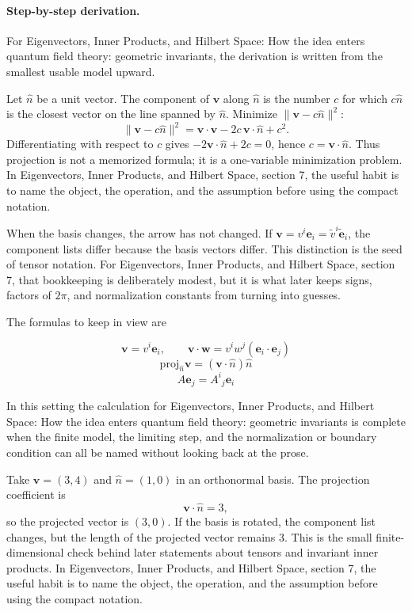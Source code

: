 \paragraph{Step-by-step derivation.}

For Eigenvectors, Inner Products, and Hilbert Space: How the idea enters quantum field theory: geometric invariants, the derivation is written from the smallest usable model upward.

Let \(\hat n\) be a unit vector.  The component of \(\bm v\) along \(\hat n\) is the number \(c\) for which \(c\hat n\) is the closest vector on the line spanned by \(\hat n\).  Minimize \(\|\bm v-c\hat n\|^2\):
\[
  \|\bm v-c\hat n\|^2=\bm v\cdot\bm v-2c\,\bm v\cdot\hat n+c^2.
\]
Differentiating with respect to \(c\) gives \(-2\bm v\cdot\hat n+2c=0\), hence \(c=\bm v\cdot\hat n\).  Thus projection is not a memorized formula; it is a one-variable minimization problem.  In Eigenvectors, Inner Products, and Hilbert Space, section 7, the useful habit is to name the object, the operation, and the assumption before using the compact notation.

When the basis changes, the arrow has not changed.  If \(\bm v=v^i\bm e_i=\tilde v^i\tilde{\bm e}_i\), the component lists differ because the basis vectors differ.  This distinction is the seed of tensor notation.  For Eigenvectors, Inner Products, and Hilbert Space, section 7, that bookkeeping is deliberately modest, but it is what later keeps signs, factors of \(2\pi\), and normalization constants from turning into guesses.

The formulas to keep in view are

\[
  \bm v=v^i\bm e_i,\qquad \bm v\cdot\bm w=v^iw^j(\bm e_i\cdot\bm e_j)
\]
\[
  \mathrm{proj}_{\hat n}\bm v=(\bm v\cdot\hat n)\hat n
\]
\[
  A\bm e_j=A^i{}_j\bm e_i
\]

In this setting the calculation for Eigenvectors, Inner Products, and Hilbert Space: How the idea enters quantum field theory: geometric invariants is complete when the finite model, the limiting step, and the normalization or boundary condition can all be named without looking back at the prose.




\begin{example}
Take \(\bm v=(3,4)\) and \(\hat n=(1,0)\) in an orthonormal basis.  The projection coefficient is
\[
  \bm v\cdot\hat n=3,
\]
so the projected vector is \((3,0)\).  If the basis is rotated, the component list changes, but the length of the projected vector remains \(3\).  This is the small finite-dimensional check behind later statements about tensors and invariant inner products.  In Eigenvectors, Inner Products, and Hilbert Space, section 7, the useful habit is to name the object, the operation, and the assumption before using the compact notation.
\end{example}



